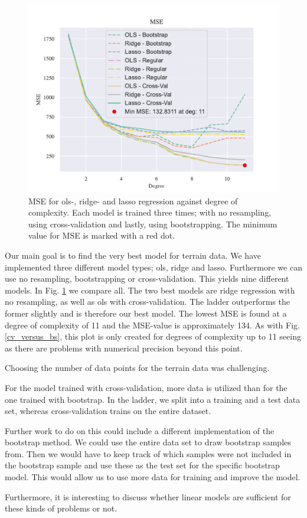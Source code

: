 \begin{figure}[h!]
    \centering
    \includegraphics[width=1\linewidth]{project_1_alt/figures/figures_in_report/All_Terrain.pdf}
    \caption{MSE for ols-, ridge- and lasso regression against degree of complexity. Each model is trained three times; with no resampling, using cross-validation and lastly, using bootstrapping. The minimum value for MSE is marked with a red dot.}
    \label{all_terrain}
\end{figure}

Our main goal is to find the very best model for terrain data. We have implemented three different model types; ols, ridge and lasso. Furthermore we can use no resampling, bootstrapping or cross-validation. This yields nine different models. In Fig. \ref{all_terrain} we compare all. The two best models are ridge regression with no resampling, as well as ols with cross-validation. The ladder outperforms the former slightly and is therefore our best model. The lowest MSE is found at a degree of complexity of 11 and the MSE-value is approximately 134. As with Fig. \ref{cv_versus_bs}, this plot is only created for degrees of complexity up to 11 seeing as there are problems with numerical precision beyond this point. 

Choosing the number of data points for the terrain data was challenging. 

For the model trained with cross-validation, more data is utilized than for the one trained with bootstrap. In the ladder, we split into a training and a test data set, whereas cross-validation trains on the entire dataset. 

Further work to do on this could include a different implementation of the bootstrap method. We could use the entire data set to draw bootstrap samples from. Then we would have to keep track of which samples were not included in the bootstrap sample and use these as the test set for the specific bootstrap model. This would allow us to use more data for training and improve the model. 

Furthermore, it is interesting to discuss whether linear models are sufficient for these kinds of problems or not. 

